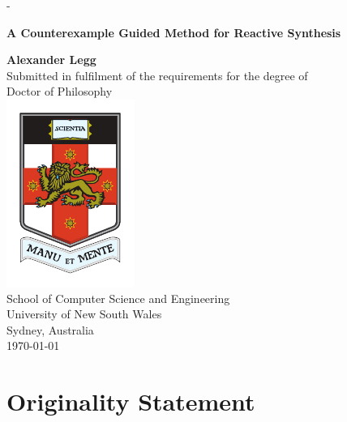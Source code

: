 \documentclass[a4paper, twoside, openright, 11pt, oldfontcommands]{memoir}
\begin{document}
\nobibliography*

\frontmatter

\thispagestyle{empty}

\calccentering{\unitlength}                         %
\begin{adjustwidth*}{\unitlength}{-\unitlength}     %
        \begin{adjustwidth}{-1cm}{-1cm}                 %

\mbox{}
\vfill
\begin{center}
    {\Huge\sffamily\bfseries A Counterexample Guided Method for Reactive Synthesis\\[1cm]\par}
{\Large\sffamily\bfseries Alexander Legg}\\[1.5cm]
Submitted in fulfilment of the requirements for the degree of \\
Doctor of Philosophy\\[1cm]
\includegraphics[width=0.32\linewidth]{unsw-crest-color-smaller} \\[1cm]
School of Computer Science and Engineering \\[0.5cm]
University of New South Wales \\[0.5cm]
Sydney, Australia \\[1.0cm]
\monthyear\today
\end{center}
\par
\vfill

    \end{adjustwidth}
\end{adjustwidth*}

\clearpage



\thispagestyle{plain}
\section*{Originality Statement}
\end{document}
